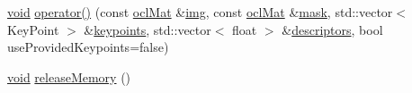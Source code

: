 \begin{DoxyCompactItemize}
\item 
\hyperlink{legacy_8hpp_a8bb47f092d473522721002c86c13b94e}{void} \hyperlink{classcv_1_1ocl_1_1SURF__OCL_a17fe83cf3292679da4608b09ac128d80}{operator()} (const \hyperlink{classcv_1_1ocl_1_1oclMat}{ocl\-Mat} \&\hyperlink{legacy_8hpp_a5349238b3772bed6eae0fda3117ccfef}{img}, const \hyperlink{classcv_1_1ocl_1_1oclMat}{ocl\-Mat} \&\hyperlink{tracking_8hpp_a6b13ecd2fd6ec7ad422f1d7863c3ad19}{mask}, std\-::vector$<$ Key\-Point $>$ \&\hyperlink{compat_8hpp_af95b6678bbbdd664ed15fe6d4190d355}{keypoints}, std\-::vector$<$ float $>$ \&\hyperlink{compat_8hpp_a1e3702ddbca6258f57508c22eff26bf2}{descriptors}, bool use\-Provided\-Keypoints=false)
\item 
\hyperlink{legacy_8hpp_a8bb47f092d473522721002c86c13b94e}{void} \hyperlink{classcv_1_1ocl_1_1SURF__OCL_aca068cfbb91614933e7bc71a11a43c29}{release\-Memory} ()
\end{DoxyCompactItemize}
